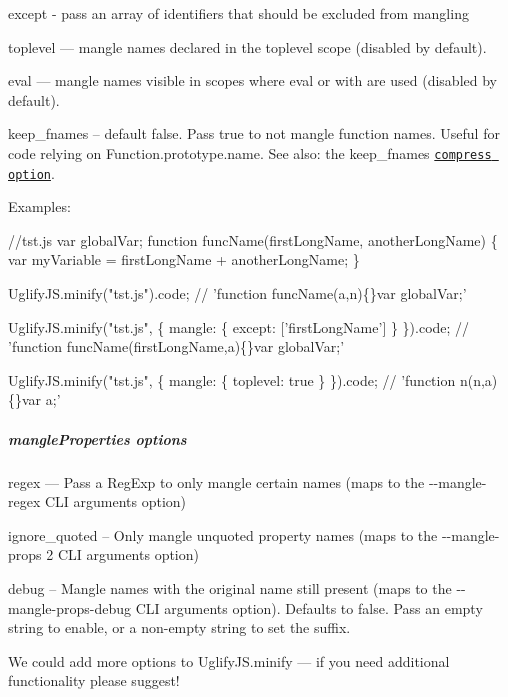 \begin{DoxyItemize}
\item {\ttfamily except} -\/ pass an array of identifiers that should be excluded from mangling
\item {\ttfamily toplevel} — mangle names declared in the toplevel scope (disabled by default).
\item {\ttfamily eval} — mangle names visible in scopes where eval or with are used (disabled by default).
\item {\ttfamily keep\+\_\+fnames} -- default {\ttfamily false}. Pass {\ttfamily true} to not mangle function names. Useful for code relying on {\ttfamily Function.\+prototype.\+name}. See also\+: the {\ttfamily keep\+\_\+fnames} \href{#compressor-options}{\tt compress option}.

Examples\+:
\end{DoxyItemize}


\begin{DoxyCode}
//tst.js
var globalVar;
function funcName(firstLongName, anotherLongName)
\{
  var myVariable = firstLongName +  anotherLongName;
\}

UglifyJS.minify("tst.js").code;
// 'function funcName(a,n)\{\}var globalVar;'

UglifyJS.minify("tst.js", \{ mangle: \{ except: ['firstLongName'] \} \}).code;
// 'function funcName(firstLongName,a)\{\}var globalVar;'

UglifyJS.minify("tst.js", \{ mangle: \{ toplevel: true \} \}).code;
// 'function n(n,a)\{\}var a;'
\end{DoxyCode}


\subparagraph*{mangle\+Properties options}


\begin{DoxyItemize}
\item {\ttfamily regex} — Pass a Reg\+Exp to only mangle certain names (maps to the {\ttfamily -\/-\/mangle-\/regex} C\+LI arguments option)
\item {\ttfamily ignore\+\_\+quoted} – Only mangle unquoted property names (maps to the {\ttfamily -\/-\/mangle-\/props 2} C\+LI arguments option)
\item {\ttfamily debug} – Mangle names with the original name still present (maps to the {\ttfamily -\/-\/mangle-\/props-\/debug} C\+LI arguments option). Defaults to {\ttfamily false}. Pass an empty string to enable, or a non-\/empty string to set the suffix.
\end{DoxyItemize}

We could add more options to {\ttfamily Uglify\+J\+S.\+minify} — if you need additional functionality please suggest!

